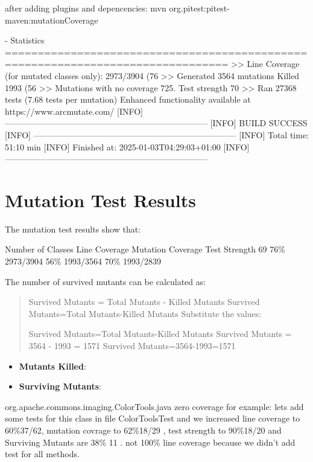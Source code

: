 \documentclass[a4paper,12pt]{report}
\begin{document}
after adding plugins and depencencies:
mvn org.pitest:pitest-maven:mutationCoverage



- Statistics
================================================================================
>> Line Coverage (for mutated classes only): 2973/3904 (76%
>> Generated 3564 mutations Killed 1993 (56%
>> Mutations with no coverage 725. Test strength 70%
>> Ran 27368 tests (7.68 tests per mutation)
Enhanced functionality available at https://www.arcmutate.com/
[INFO] ------------------------------------------------------------------------
[INFO] BUILD SUCCESS
[INFO] ------------------------------------------------------------------------
[INFO] Total time:  51:10 min
[INFO] Finished at: 2025-01-03T04:29:03+01:00
[INFO] ------------------------------------------------------------------------




\section{Mutation Test Results}
The mutation test results show that:

Number of Classes	Line Coverage	Mutation Coverage	Test Strength
69	76\% 2973/3904	56\% 1993/3564	70\% 1993/2839


The number of survived mutants can be calculated as:

\begin{quote}
    Survived Mutants
=
Total Mutants -
Killed Mutants
Survived Mutants=Total Mutants-Killed Mutants
Substitute the values:

Survived Mutants=Total Mutants-Killed Mutants
Survived Mutants
=
3564 -
1993
=
1571
Survived Mutants=3564-1993=1571

\end{quote} 
\begin{itemize}
    \item \textbf{Mutants Killed}:
    \item \textbf{Surviving Mutants}:
\end{itemize}

org.apache.commons.imaging.ColorTools.java zero coverage for example: lets add some tests for this class in file ColorToolsTest
and we increased line coverage to 60\%37/62, mutation covrage to 62\%18/29	, test strength to 90\%18/20 and Surviving Mutants are 38\% 11 . not 100\% line coverage because we didn't add test for all methods.


\newpage
\end{document}
